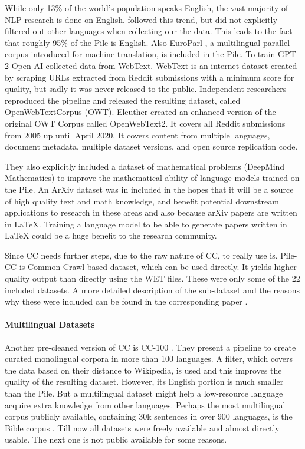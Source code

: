 \documentclass[
]{krantz}
\begin{document}
While only 13\% of the world's population speaks English, the vast majority of NLP research is done on English. \citet{gao2020pile} followed this trend, but did not explicitly filtered out other languages when collecting our the data. This leads to the fact that roughly 95\% of the Pile is English. Also EuroParl \citep{koehn2005europarl}, a multilingual parallel corpus introduced for machine translation, is included in the Pile. To train GPT-2 Open AI collected data from WebText. WebText is an internet dataset created by scraping URLs extracted from Reddit submissions with a minimum score for quality, but sadly it was never released to the public. Independent researchers reproduced the pipeline and released the resulting dataset, called OpenWebTextCorpus \citep{Gokaslan2019OpenWeb} (OWT). Eleuther created an enhanced version of the original OWT Corpus called OpenWebText2. It covers all Reddit submissions from 2005 up until April 2020. It covers content from multiple languages, document metadata, multiple dataset versions, and open source replication code.

They also explicitly included a dataset of mathematical problems (DeepMind Mathematics) to improve the mathematical ability of language models trained on the Pile. An ArXiv dataset was in included in the hopes that it will be a source of high quality text and math knowledge, and benefit potential downstream applications to research in these areas and also because arXiv papers are written in LaTeX. Training a language model to be able to generate papers written in LaTeX could be a huge benefit to the research community.

Since CC needs further steps, due to the raw nature of CC, to really use is. Pile-CC is Common Crawl-based dataset, which can be used directly. It yields higher quality output than directly using the WET files. These were only some of the 22 included datasets. A more detailed description of the sub-dataset and the reasons why these were included can be found in the corresponding paper \citep{gao2020pile}.

\hypertarget{multilingual-datasets}{%
\paragraph{Multilingual Datasets}\label{multilingual-datasets}}

Another pre-cleaned version of CC is CC-100 \citep{wenzek2019ccnet}. They present a pipeline to create curated monolingual corpora in more than 100 languages. A filter, which covers the data based on their distance to Wikipedia, is used and this improves the quality of the resulting dataset. However, its English portion is much smaller than the Pile. But a multilingual dataset might help a low-resource language acquire extra knowledge from other languages.
Perhaps the most multilingual corpus publicly available, containing 30k sentences in over 900 languages, is the Bible corpus \citep{mayer2014creating}.
Till now all datasets were freely available and almost directly usable. The next one is not public available for some reasons.
\end{document}
